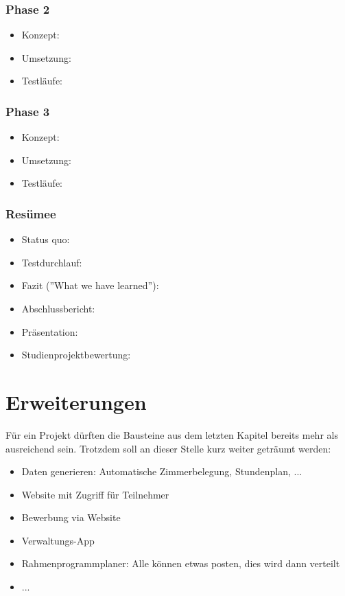 \documentclass[a4paper]{scrartcl}
\begin{document}
\subsubsection{Phase 2}
	\begin{itemize}
		\item Konzept:
		\item Umsetzung:
		\item Testläufe:
	\end{itemize}

\subsubsection{Phase 3}
	\begin{itemize}
		\item Konzept:
		\item Umsetzung:
		\item Testläufe:
	\end{itemize}

\subsubsection{Resümee}
	\begin{itemize}
		\item Status quo:
		\item Testdurchlauf:
		\item Fazit (''What we have learned''):
		\item Abschlussbericht:
		\item Präsentation:
		\item Studienprojektbewertung:
	\end{itemize}


\pagebreak
\eject

\section{Erweiterungen}
Für ein Projekt dürften die Bausteine aus dem letzten Kapitel bereits mehr als ausreichend sein. Trotzdem soll an dieser Stelle kurz weiter geträumt werden:

\begin{itemize}
	\item Daten generieren: Automatische Zimmerbelegung, Stundenplan, ...
	\item Website mit Zugriff für Teilnehmer
	\item Bewerbung via Website
	\item Verwaltungs-App
	\item Rahmenprogrammplaner: Alle können etwas posten, dies wird dann verteilt
	\item ...
\end{itemize}
	
\pagebreak
\eject
	
\end{document}
